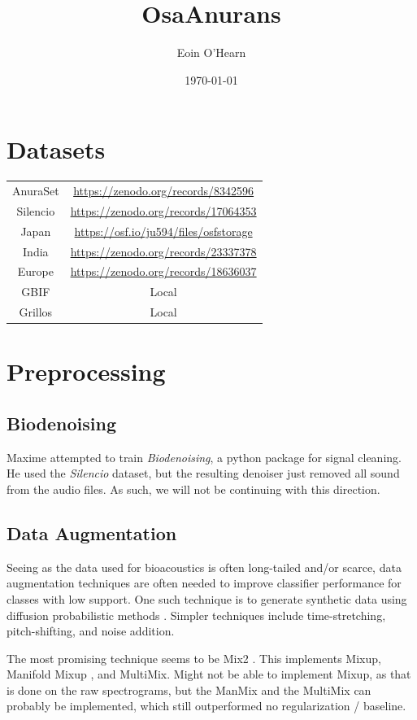 \documentclass{article}
\title{OsaAnurans}
\author{Eoin O'Hearn}
\date{\today}
\begin{document}
\maketitle

\section{Datasets}
\begin{center}
    \begin{tabular}{c c}
        AnuraSet & \url{https://zenodo.org/records/8342596} \\
        Silencio & \url{https://zenodo.org/records/17064353}\\
        Japan & \url{https://osf.io/ju594/files/osfstorage}\\
        India & \url{https://zenodo.org/records/23337378}\\
        Europe & \url{https://zenodo.org/records/18636037}\\
        GBIF & Local\\
        Grillos & Local
    \end{tabular}
\end{center}
\section{Preprocessing}
\subsection{Biodenoising}
Maxime attempted to train \textit{Biodenoising}, a python package for signal cleaning. 
He used the \textit{Silencio} dataset, but the resulting denoiser just removed all sound from the audio files. 
As such, we will not be continuing with this direction. 
\subsection{Data Augmentation}
Seeing as the data used for bioacoustics is often long-tailed and/or scarce, data augmentation techniques are often needed to improve classifier performance for classes with low support. One such technique is to generate synthetic data using diffusion probabilistic methods \cite{manriqueAnuranCallSynthesis2025}. Simpler techniques include time-stretching, pitch-shifting, and noise addition.

The most promising technique seems to be Mix2 \cite{moummadMixtureMixupsMultilabel2024}. This implements Mixup, Manifold Mixup \cite{vermaManifoldMixupBetter2019}, and MultiMix. Might not be able to implement Mixup, as that is done on the raw spectrograms, but the ManMix and the MultiMix can probably be implemented, which still outperformed no regularization / baseline.
\end{document}
